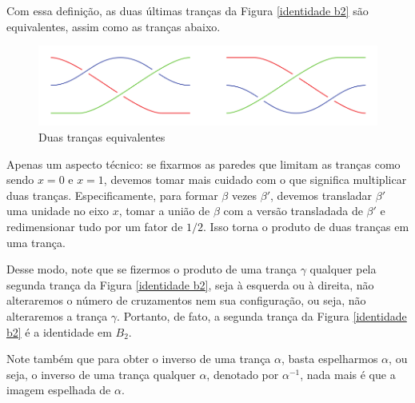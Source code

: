 \documentclass[a4paper,portuguese,11pt,twoside, leqno]{book}
\theoremstyle{definition}
\newtheorem{exercise}{Exercício}[section]
\begin{document}
	\par\vspace{0.3cm} Com essa definição, as duas últimas tranças da Figura \eqref{identidade b2} são equivalentes, assim como as tranças abaixo.
	
	\begin{figure}[H]
		\captionsetup{justification=centering}
		\begin{center}
			\includegraphics[width=12cm]{fig_18_6.png}
		\end{center}\caption{Duas tranças equivalentes}\label{trancas equivalentes}
	\end{figure}   
	
	\par\vspace{0.3cm} Apenas um aspecto técnico: se fixarmos as paredes que limitam as tranças como sendo $x = 0$ e $x=1$, devemos tomar mais cuidado com o que significa multiplicar duas tranças. Especificamente, para formar $\beta$ vezes $\beta'$, devemos transladar $\beta'$ uma unidade no eixo $x$, tomar a união de $\beta$ com a versão transladada de $\beta'$ e redimensionar tudo por um fator de $1/2$. Isso torna o produto de duas tranças em uma trança.
	
	\par\vspace{0.3cm} Desse modo, note que se fizermos o produto de uma trança $\gamma$ qualquer pela segunda trança da Figura \eqref{identidade b2}, seja à esquerda ou à direita, não alteraremos o número de cruzamentos nem sua configuração, ou seja, não alteraremos a trança $\gamma$. Portanto, de fato, a segunda trança da Figura \eqref{identidade b2} é a identidade em $B_2$.
	
	\par\vspace{0.3cm} Note também que para obter o inverso de uma trança $\alpha$, basta espelharmos $\alpha$, ou seja, o inverso de uma trança qualquer $\alpha$, denotado por $\alpha^{-1}$, nada mais é que a imagem espelhada de $\alpha$.   
	
	
	
\end{document}
